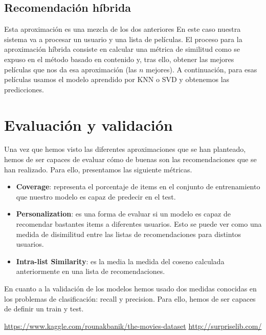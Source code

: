 		
		\subsection{Recomendación híbrida}				

			Esta aproximación es una mezcla de los dos anteriores En este caso nuestra sistema va a procesar un usuario y una lista de películas. El proceso para la aproximación híbrida consiste en calcular una métrica de similitud como se expuso en el método basado en contenido y, tras ello, obtener las mejores películas que nos da esa aproximación (las $n$ mejores). A continuación, para esas películas usamos el modelo aprendido por KNN o SVD y obtenemos las predicciones.

	\section{Evaluación y validación}
	
		Una vez que hemos visto las diferentes aproximaciones que se han planteado, hemos de ser capaces de evaluar cómo de buenas son las recomendaciones que se han realizado. Para ello, presentamos las siguiente métricas.
		
		\begin{itemize}
			\item \textbf{Coverage}: representa el porcentaje de items en el conjunto de entrenamiento que nuestro modelo es capaz de predecir en el test. 
			\item \textbf{Personalization}: es una forma de evaluar si un modelo es capaz de recomendar bastantes items a diferentes usuarios. Esto se puede ver como una medida de disimilitud entre las listas de recomendaciones para distintos usuarios.
			\item \textbf{Intra-list Similarity}: es la media la medida del coseno calculada anteriormente en una lista de recomendaciones.			
		\end{itemize}
		
		En cuanto a la validación de los modelos hemos usado dos medidas conocidas en los problemas de clasificación: recall y precision. Para ello, hemos de ser capaces de definir un train y test.
		
	
\begin{thebibliography}{X}
	 \url{https://www.kaggle.com/rounakbanik/the-movies-dataset}
	 \url{http://surpriselib.com/}
\end{thebibliography}



